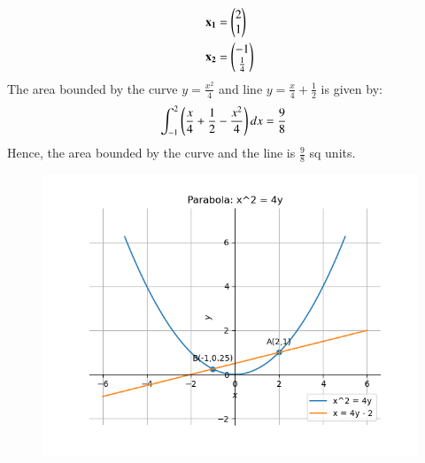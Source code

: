 \documentclass[journal]{IEEEtran}
\begin{document}
\begin{align}
	\mathbf{x_1} &= \begin{pmatrix}2 \\1\end{pmatrix}\\
	\mathbf{x_2} &= \begin{pmatrix}-1\\ \frac{1}{4}\end{pmatrix}
\end{align}
The area bounded by the curve $y = \frac{x^2}{4}$ and line $y = \frac{x}{4}+\frac{1}{2}$ is given by:
\begin{align}
	\int_{-1}^{2}\left(\frac{x}{4}+\frac{1}{2}-\frac{x^2}{4}\right)dx &= \frac{9}{8} 
\end{align}
Hence, the area bounded by the curve and the line is $\frac{9}{8}$ sq units.\\
\begin{figure}[h]
	\centering
	\includegraphics[scale=0.7]{figs/plot.png}
	\label{Fig}
\end{figure}
\end{document}
